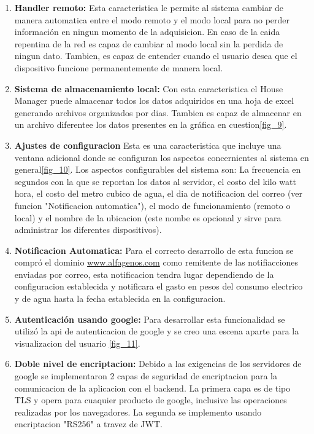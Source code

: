 \begin{enumerate}
	\item \textbf{Handler remoto:} Esta caracteristica le permite al sistema cambiar de manera automatica entre el modo remoto y el modo local para no perder información en ningun momento de la adquisicion. En caso de la caida repentina de la red es capaz de cambiar al modo local sin la perdida de ningun dato. Tambien, es capaz de entender cuando el usuario desea que el dispositivo funcione permanentemente de manera local.
	
	\item \textbf{Sistema de almacenamiento local:} Con esta caracteristica el House Manager puede almacenar todos los datos adquiridos en una hoja de excel generando archivos organizados por dias. Tambien es capaz de almacenar en un archivo diferentee los datos presentes en la gráfica en cuestion\ref{fig_9}.
	
	\item \textbf{Ajustes de configuracion} Esta es una caracteristica que incluye una ventana adicional donde se configuran los aspectos concernientes al sistema en general\ref{fig_10}. Los aspectos configurables del sistema son: La frecuencia en segundos con la que se reportan los datos al servidor, el costo del kilo watt hora, el costo del metro cubico de agua, el dia de notificacion del correo (ver funcion "Notificacion automatica"), el modo de funcionamiento (remoto o local) y el nombre de la ubicacion (este nombe es opcional y sirve para administrar los diferentes dispositivos).
	
	\item \textbf{Notificacion Automatica:} Para el correcto desarrollo de esta funcion se compró el dominio \href{www.alfagenos.com}{www.alfagenos.com} como remitente de las notifiacciones enviadas por correo, esta notificacion tendra lugar dependiendo de la configuracion establecida y notificara el gasto en pesos del consumo electrico y de agua hasta la fecha establecida en la configuracion.

	\item\textbf{Autenticación usando google:} Para desarrollar esta funcionalidad se utilizó la api de autenticacion de google y se creo una escena aparte para la visualizacion del usuario \ref{fig_11}.
	
	
	\item \textbf{Doble nivel de encriptacion:} Debido a las exigencias de los servidores de google se implementaron 2 capas de seguridad de encriptacion para la  comunicacion de la aplicacion con el backend. La primera capa es de tipo TLS y opera para cuaquier producto de google, inclusive las operaciones realizadas por los navegadores. La segunda se implemento usando encriptacion "RS256" a travez de JWT.
\end{enumerate}


